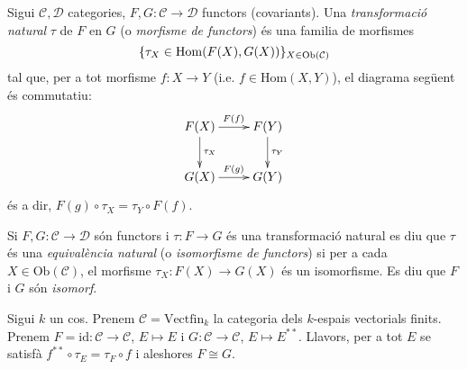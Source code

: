\documentclass[../main.tex]{subfiles}
\begin{document}
\begin{defi}
\label{def:isomorfismefunctors} Sigui $\mathcal{C}, \mathcal{D}$ categories, $F,G:\mathcal{C}\rightarrow\mathcal{D}$ functors (covariants). Una \textit{transformació natural} $\tau$ de $F$ en $G$ (o \textit{morfisme de functors}) és una familia de morfismes
\begin{equation}
    \notag
    \{\tau_X\in \mathrm{Hom}(F(X),G(X))\}_{X\in\mathrm{Ob}(\mathcal{C})}
\end{equation}
tal que, per a tot morfisme $f:X\rightarrow Y$ (i.e. $f\in\mathrm{Hom}(X,Y)$), el diagrama següent és commutatiu:
\begin{equation}
    \notag
    \xymatrix{
    F(X) \ar[r]^{F(f)} \ar[d]^{\tau_X} & F(Y) \ar[d]^{\tau_Y} \\
    G(X) \ar[r]^{F(g)}                 & G(Y)
    }
\end{equation}
és a dir, $F(g)\circ\tau_X = \tau_Y\circ F(f)$.
\end{defi}

\begin{defi}
Si $F,G:\mathcal{C}\rightarrow\mathcal{D}$ són functors i $\tau:F\rightarrow G$ és una transformació natural es diu que $\tau$ és una \textit{equivalència natural} (o \textit{isomorfisme de functors}) si per a cada $X\in\mathrm{Ob}(\mathcal{C})$, el morfisme $\tau_X:F(X)\rightarrow G(X)$ és un isomorfisme. Es diu que $F$ i $G$ són \textit{isomorf}.
\end{defi}

\begin{ej}
Sigui $k$ un cos. Prenem $\mathcal{C} = \mathrm{Vectfin}_k$ la categoria dels $k$-espais vectorials finits. Prenem $F = \mathrm{id}:\mathcal{C}\rightarrow\mathcal{C}$, $E\mapsto E$ i $G:\mathcal{C}\rightarrow\mathcal{C}$, $E\mapsto E^{**}$. Llavors, per a tot $E$ se satisfà $f^{**}\circ\tau_E = \tau_F\circ f$ i aleshores $F\cong G$.
\end{ej}




\end{document}
